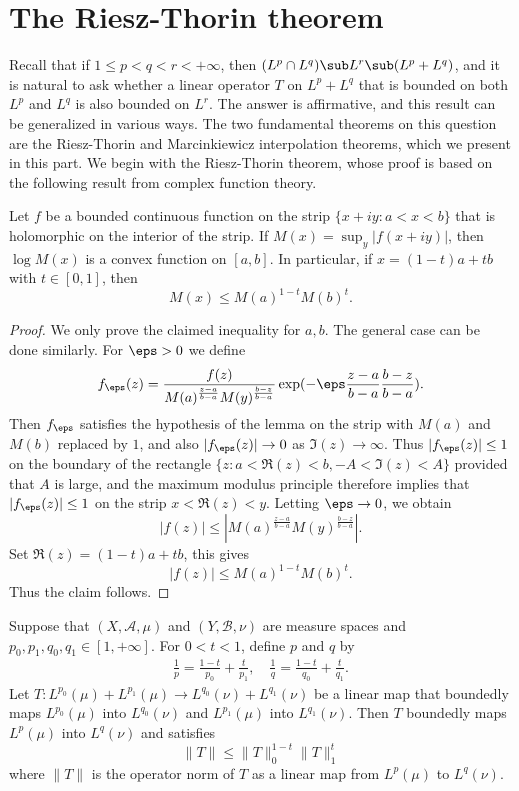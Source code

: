 \section{The Riesz-Thorin theorem}
Recall that if $1\leq p<q<r<+\infty$, then $(L^p\cap L^q)\sub L^r\sub(L^p+L^q)$, and it is natural to ask whether a linear operator $T$ on $L^p+L^q$ that is bounded on both $L^p$ and $L^q$ is also bounded on $L^r$. The answer is affirmative, and this result can be generalized in various ways. The two fundamental theorems on this question are the Riesz-Thorin and Marcinkiewicz interpolation theorems, which we present in this part.
We begin with the Riesz-Thorin theorem, whose proof is based on the following result from complex function theory.
\begin{proposition}
Let $f$ be a bounded continuous function on the strip $\{x+iy:a<x<b\}$ that is holomorphic on the interior of the strip. If $M(x)=\sup_y|f(x+iy)|$, then $\log M(x)$ is a convex function on $[a,b]$. In particular, if $x=(1-t)a+tb$ with $t\in[0,1]$, then
\[M(x)\leq M(a)^{1-t}M(b)^{t}.\] 
\end{proposition}
\begin{proof}
We only prove the claimed inequality for $a,b$. The general case can be done similarly. For $\eps>0$ we define
\[f_\eps(z)=\frac{f(z)}{M(a)^{\frac{z-a}{b-a}}M(y)^{\frac{b-z}{b-a}}}\exp(-\eps\frac{z-a}{b-a}\frac{b-z}{b-a}).\]
Then $f_\eps$ satisfies the hypothesis of the lemma on the strip with $M(a)$ and $M(b)$ replaced by $1$, and also $|f_\eps(z)|\to 0$ as $\Im(z)\to\infty$. Thus $|f_\eps(z)|\leq 1$ on the boundary of the rectangle $\{z:a<\Re(z)<b,-A<\Im(z)<A\}$ provided that $A$ is large, and the maximum modulus principle therefore implies that $|f_\eps(z)|\leq 1$ on the strip $x<\Re(z)<y$. Letting $\eps\to 0$, we obtain
\[|f(z)|\leq|M(a)^{\frac{z-a}{b-a}}M(y)^{\frac{b-z}{b-a}}|.\]
Set $\Re(z)=(1-t)a+tb$, this gives
\[|f(z)|\leq M(a)^{1-t}M(b)^{t}.\]
Thus the claim follows.
\end{proof}
\begin{theorem}
Suppose that $(X,\mathcal{A},\mu)$ and $(Y,\mathcal{B},\nu)$ are measure spaces and $p_0,p_1,q_0,q_1\in[1,+\infty]$. For $0<t<1$, define $p$ and $q$ by
\begin{align}\label{interpolation index}
\frac{1}{p}=\frac{1-t}{p_0}+\frac{t}{p_1},\quad\frac{1}{q}=\frac{1-t}{q_0}+\frac{t}{q_1}.
\end{align}
Let $T:L^{p_0}(\mu)+L^{p_1}(\mu)\to L^{q_0}(\nu)+L^{q_1}(\nu)$ be a linear map that boundedly maps $L^{p_0}(\mu)$ into $L^{q_0}(\nu)$ and $L^{p_1}(\mu)$ into $L^{q_1}(\nu)$. Then $T$ boundedly maps $L^{p}(\mu)$ into $L^{q}(\nu)$ and satisfies
\[\|T\|\leq\|T\|_0^{1-t}\|T\|_1^{t}\]
where $\|T\|$ is the operator norm of $T$ as a linear map from $L^{p}(\mu)$ to $L^{q}(\nu)$.
\end{theorem}
